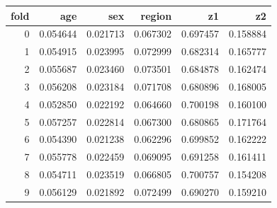 \begin{tabular}{rrrrrr}
\toprule
fold & age & sex & region & z1 & z2 \\
\midrule
0 & 0.054644 & 0.021713 & 0.067302 & 0.697457 & 0.158884 \\
1 & 0.054915 & 0.023995 & 0.072999 & 0.682314 & 0.165777 \\
2 & 0.055687 & 0.023460 & 0.073501 & 0.684878 & 0.162474 \\
3 & 0.056208 & 0.023184 & 0.071708 & 0.680896 & 0.168005 \\
4 & 0.052850 & 0.022192 & 0.064660 & 0.700198 & 0.160100 \\
5 & 0.057257 & 0.022814 & 0.067300 & 0.680865 & 0.171764 \\
6 & 0.054390 & 0.021238 & 0.062296 & 0.699852 & 0.162222 \\
7 & 0.055778 & 0.022459 & 0.069095 & 0.691258 & 0.161411 \\
8 & 0.054711 & 0.023519 & 0.066805 & 0.700757 & 0.154208 \\
9 & 0.056129 & 0.021892 & 0.072499 & 0.690270 & 0.159210 \\
\bottomrule
\end{tabular}
